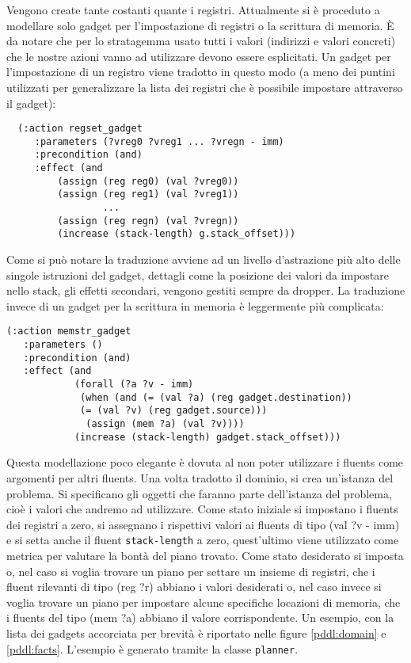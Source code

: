 Vengono create tante costanti quante i registri.  Attualmente si è
proceduto a modellare solo gadget per l'impostazione di registri o la
scrittura di memoria. È da notare che per lo stratagemma usato tutti i
valori (indirizzi e valori concreti) che le nostre azioni vanno ad
utilizzare devono essere esplicitati. Un gadget per l'impostazione di
un registro viene tradotto in questo modo (a meno dei puntini
utilizzati per generalizzare la lista dei registri che è possibile
impostare attraverso il gadget):

\begin{lstlisting}
  (:action regset_gadget
	 :parameters (?vreg0 ?vreg1 ... ?vregn - imm)
	 :precondition (and)
	 :effect (and
	 	 (assign (reg reg0) (val ?vreg0))
	 	 (assign (reg reg1) (val ?vreg1))
                 ...
	 	 (assign (reg regn) (val ?vregn))
		 (increase (stack-length) g.stack_offset)))
\end{lstlisting}

Come si può notare la traduzione avviene ad un livello d'astrazione
più alto delle singole istruzioni del gadget, dettagli come la
posizione dei valori da impostare nello stack, gli effetti secondari,
vengono gestiti sempre da dropper. La traduzione invece di un gadget
per la scrittura in memoria è leggermente più complicata:

\begin{lstlisting}
(:action memstr_gadget
   :parameters ()
   :precondition (and)
   :effect (and 
            (forall (?a ?v - imm)
             (when (and (= (val ?a) (reg gadget.destination)) 
             (= (val ?v) (reg gadget.source)))
              (assign (mem ?a) (val ?v))))
            (increase (stack-length) gadget.stack_offset)))

\end{lstlisting}

Questa modellazione poco elegante è dovuta al non poter utilizzare i
fluents come argomenti per altri fluents.  Una volta tradotto il
dominio, si crea un'istanza del problema. Si specificano gli oggetti
che faranno parte dell'istanza del problema, cioè i valori che andremo
ad utilizzare. Come stato iniziale si impostano i fluents dei registri
a zero, si assegnano i rispettivi valori ai fluents di tipo (val ?v -
imm) e si setta anche il fluent \lstinline{stack-length} a zero,
quest'ultimo viene utilizzato come metrica per valutare la bontà del
piano trovato. Come stato desiderato si imposta o, nel caso si voglia
trovare un piano per settare un insieme di registri, che i fluent
rilevanti di tipo (reg ?r) abbiano i valori desiderati o, nel caso
invece si voglia trovare un piano per impostare alcune specifiche
locazioni di memoria, che i fluents del tipo (mem ?a) abbiano il
valore corrispondente. Un esempio, con la lista dei gadgets accorciata
per brevità è riportato nelle figure \ref{pddl:domain} e
\ref{pddl:facts}. L'esempio è generato tramite la classe
\lstinline{planner}.


